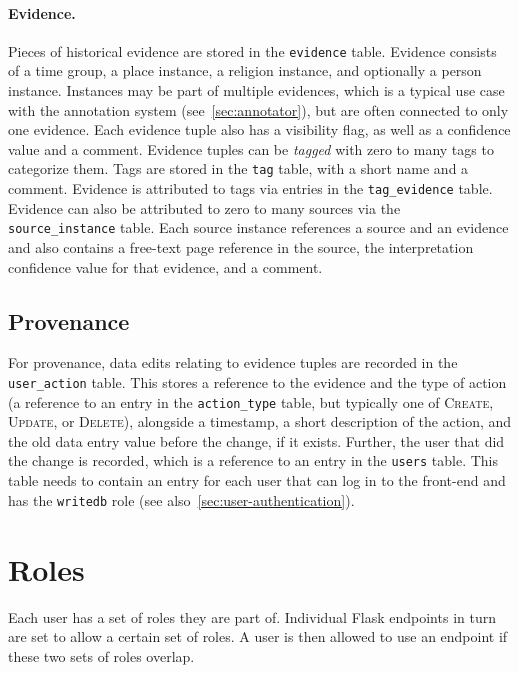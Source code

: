 \paragraph{Evidence.}\label{par:evidence}
Pieces of historical evidence are stored in the \verb!evidence! table.
Evidence consists of a time group, a place instance, a religion instance, and optionally a person instance.
Instances may be part of multiple evidences, which is a typical use case with the annotation system (see~\cref{sec:annotator}), but are often connected to only one evidence.
Each evidence tuple also has a visibility flag, as well as a confidence value and a comment.
Evidence tuples can be \emph{tagged} with zero to many tags to categorize them.
Tags are stored in the \verb!tag! table, with a short name and a comment.
Evidence is attributed to tags via entries in the \verb!tag_evidence! table.
Evidence can also be attributed to zero to many sources via the \verb!source_instance! table.
Each source instance references a source and an evidence and also contains a free-text page reference in the source, the interpretation confidence value for that evidence, and a comment.



\subsection{Provenance}
\label{sec:provenance-tables}

For provenance, data edits relating to evidence tuples are recorded in the \verb!user_action! table.
This stores a reference to the evidence and the type of action (a reference to an entry in the \verb!action_type! table, but typically one of \textsc{Create}, \textsc{Update}, or \textsc{Delete}), alongside a timestamp, a short description of the action, and the old data entry value before the change, if it exists.
Further, the user that did the change is recorded, which is a reference to an entry in the \verb!users! table.
This table needs to contain an entry for each user that can log in to the front-end and has the \verb!writedb! role (see also~\cref{sec:user-authentication}).


\section{Roles}
\label{sec:roles}

Each user has a set of roles they are part of.
Individual Flask endpoints in turn are set to allow a certain set of roles.
A user is then allowed to use an endpoint if these two sets of roles overlap.

